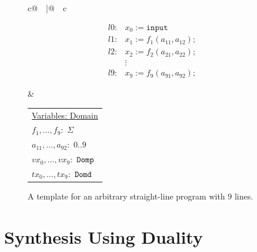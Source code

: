 \documentclass[preprint]{sig-alternate-05-2015}
\def\domp{{\tt{Domp}}}
\def\domd{{\tt{Domd}}}
\def\Sig{{\Sigma}}
\begin{document}
\begin{figure}[t]
  \begin{tabular}{c@{$\quad$}|@{$\quad$}c}
    \begin{minipage}{40mm}
\begin{center}
\[
  \begin{array}{ll}
    l0: & x_0 := \mathtt{input}
    \\
    l1: & x_1 := f_1(a_{11}, a_{12});
    \\
    l2: & x_2 := f_2(a_{21}, a_{22});
    \\
    & \vdots
    \\
    l9: & x_9 := f_9(a_{91}, a_{92});
  \end{array}
\]
\end{center}
    \end{minipage}
    &
    \begin{minipage}{20mm}
      \begin{tabular}{l}
        \underline{Variables: Domain}
        \\ %
        $f_1,\ldots,f_9:$   $\Sig$
        \\
        $a_{11},\ldots,a_{92}:$   $0..9$
        \\
        $vx_0,\ldots,vx_9:$ $\domp$
        \\
        $tx_0,\ldots,tx_9:$ $\domd$
      \end{tabular}
    \end{minipage}
  \end{tabular}
\caption{A template for an arbitrary straight-line program with $9$ lines. %
}\label{fig:sketch}
\end{figure}

\section{Synthesis Using Duality}
\label{sec:synthesis}
\end{document}
